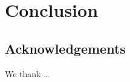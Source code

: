 \documentclass[aps,preprint,nofootinbib,floatfix]{revtex4-1}
\begin{document}
\section{Conclusion}


\subsection*{Acknowledgements}
We thank \ldots




\end{document}

